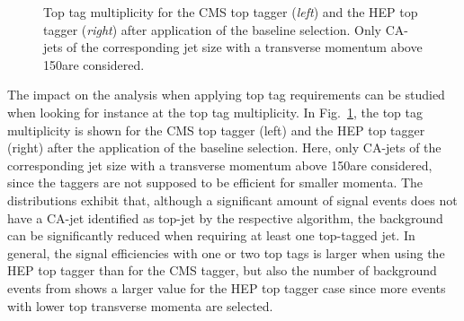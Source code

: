 \begin{figure}[!t]
  \centering
{}
  \caption{Top tag multiplicity for the CMS top tagger (\textit{left}) and the HEP top tagger (\textit{right}) after application of the baseline selection. Only CA-jets of the corresponding jet size with a transverse momentum above 150\gev are considered.}
  \label{fig:stop_top_tag_multi}
\end{figure} 
The impact on the analysis when applying top tag requirements can be studied when looking for instance at the top tag multiplicity. In Fig.~\ref{fig:stop_top_tag_multi}, the top tag multiplicity is shown for the CMS top tagger (left) and the HEP top tagger (right) after the application of the baseline selection. Here, only CA-jets of the corresponding jet size with a transverse momentum above 150\gev are considered, since the taggers are not supposed to be efficient for smaller momenta. The distributions exhibit that, although a significant amount of signal events does not have a CA-jet identified as top-jet by the respective algorithm, the background can be significantly reduced when requiring at least one top-tagged jet. In general, the signal efficiencies with one or two top tags is larger when using the HEP top tagger than for the CMS tagger, but also the number of background events from \ttbar shows a larger value for the HEP top tagger case since more \ttbar events with lower top transverse momenta are selected. \\
